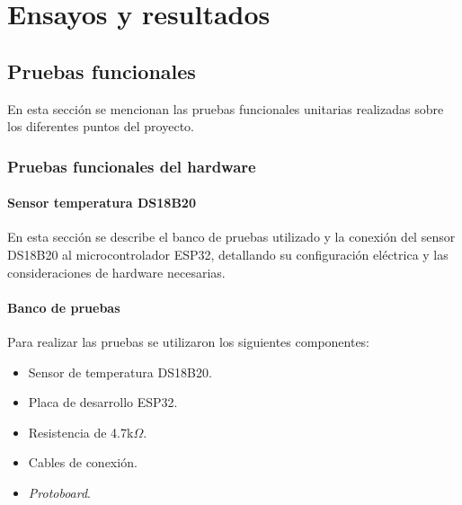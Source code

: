 
\chapter{Ensayos y resultados} %

\label{Chapter5} 


\section{Pruebas funcionales}
\label{sec:pruebas}
En esta sección se mencionan las pruebas funcionales unitarias realizadas sobre los diferentes puntos del proyecto.

\subsection{Pruebas funcionales del hardware}
\label{sec:pruebasHW}

\subsubsection{Sensor temperatura DS18B20}
En esta sección se describe el banco de pruebas utilizado y la conexión del sensor DS18B20 al microcontrolador ESP32, detallando su configuración eléctrica y las consideraciones de hardware necesarias.

\subsubsection{Banco de pruebas}
Para realizar las pruebas se utilizaron los siguientes componentes:
\begin{itemize}
    \item Sensor de temperatura DS18B20.
    \item Placa de desarrollo ESP32.
    \item Resistencia de 4.7k$\Omega$.
    \item Cables de conexión.
    \item \textit{Protoboard}.
\end{itemize}

